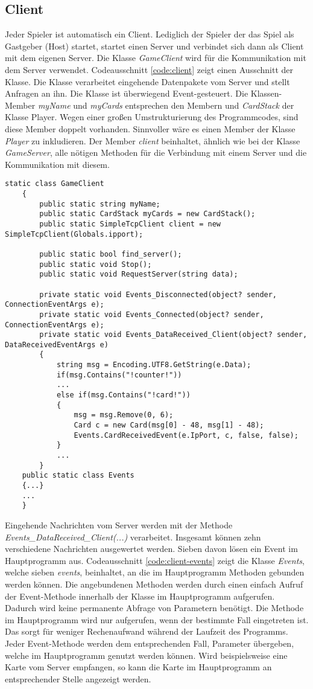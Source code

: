 \subsection{Client}
Jeder Spieler ist automatisch ein Client. Lediglich der Spieler der das Spiel als Gastgeber (Host) startet, startet einen Server und verbindet sich dann als Client mit dem eigenen Server. Die Klasse \textit{GameClient} wird für die Kommunikation mit dem Server verwendet. Codeausschnitt \ref{code:client} zeigt einen Ausschnitt der Klasse. Die Klasse verarbeitet eingehende Datenpakete vom Server und stellt Anfragen an ihn. Die Klasse ist überwiegend Event-gesteuert. Die Klassen-Member \textit{myName} und \textit{myCards} entsprechen den Membern  und \textit{CardStack} der Klasse Player. Wegen einer großen Umstrukturierung des Programmcodes, sind diese Member doppelt vorhanden. Sinnvoller wäre es einen Member der Klasse \textit{Player} zu inkludieren. Der Member \textit{client} beinhaltet, ähnlich wie bei der Klasse \textit{GameServer}, alle nötigen Methoden für die Verbindung mit einem Server und die Kommunikation mit diesem.
\begin{lstlisting}[label=code:client, caption={Codeausschnitt Klasse GameClient}]
 	static class GameClient
	{
		public static string myName;
		public static CardStack myCards = new CardStack();
		public static SimpleTcpClient client = new SimpleTcpClient(Globals.ipport);
		
		public static bool find_server();
		public static void Stop();
		public static void RequestServer(string data);
		
		private static void Events_Disconnected(object? sender, ConnectionEventArgs e);
		private static void Events_Connected(object? sender, ConnectionEventArgs e);
		private static void Events_DataReceived_Client(object? sender, DataReceivedEventArgs e)
		{
			string msg = Encoding.UTF8.GetString(e.Data);
			if(msg.Contains("!counter!"))
			...
			else if(msg.Contains("!card!"))
			{
				msg = msg.Remove(0, 6);
				Card c = new Card(msg[0] - 48, msg[1] - 48);
				Events.CardReceivedEvent(e.IpPort, c, false, false);
			}
			...
		}
	public static class Events
	{...}
	...
	}
\end{lstlisting}
Eingehende Nachrichten vom Server werden mit der Methode \textit{Events\_DataReceived\_Client(...)} verarbeitet. Insgesamt können zehn verschiedene Nachrichten ausgewertet werden. Sieben davon lösen ein Event im Hauptprogramm aus. Codeausschnitt \ref{code:client-events} zeigt die Klasse \textit{Events}, welche sieben \textit{events}, beinhaltet, an die im Hauptprogramm Methoden gebunden werden können. Die angebundenen Methoden werden durch einen einfach Aufruf der Event-Methode innerhalb der Klasse im Hauptprogramm aufgerufen. Dadurch wird keine permanente Abfrage von Parametern benötigt. Die Methode im Hauptprogramm wird nur aufgerufen, wenn der bestimmte Fall eingetreten ist. Das sorgt für weniger Rechenaufwand während der Laufzeit des Programms. Jeder Event-Methode werden dem entsprechenden Fall, Parameter übergeben, welche im Hauptprogramm genutzt werden können. Wird beispielsweise eine Karte vom Server empfangen, so kann die Karte im Hauptprogramm an entsprechender Stelle angezeigt werden. 
